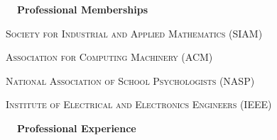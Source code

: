 \documentclass[hidelinks, 10.5pt]{article}
\newcommand{\contentwidth}{0.9\linewidth}
\newcommand{\sectionspacing}{8mm}
\newcommand{\sectiontocontentspacing}{4mm}
\begin{document}
{{\fontsize{14}{14}\selectfont \textbf{\ \ Professional Memberships\ \ }}\hrulefill

\vspace{\sectiontocontentspacing}

\begin{minipage}[ct]{\contentwidth}
    \textsc{Society for Industrial and Applied Mathematics} (SIAM)
\end{minipage}

\vspace{0.5mm}

\begin{minipage}[ct]{\contentwidth}
    \textsc{Association for Computing Machinery} (ACM)
\end{minipage}

\vspace{0.5mm}

\begin{minipage}[ct]{\contentwidth}
    \textsc{National Association of School Psychologists} (NASP)
\end{minipage}

\vspace{0.5mm}

\begin{minipage}[ct]{\contentwidth}
    \textsc{Institute of Electrical and Electronics Engineers} (IEEE)
\end{minipage}

\vspace{-2mm}



\vspace{\sectionspacing}
{\fontsize{14}{14}\selectfont \textbf{\ \ Professional Experience\ \ }}\hrulefill

}
\end{document}
